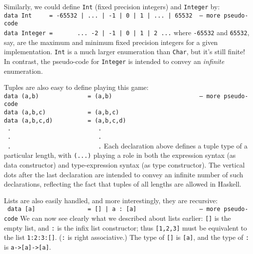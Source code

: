 Similarly, we could define \mbox{\tt Int} (fixed precision integers) and
\mbox{\tt Integer} by: 
\bprog
\mbox{\tt data\ Int\ \ \ \ \ =\ -65532\ |\ ...\ |\ -1\ |\ 0\ |\ 1\ |\ ...\ |\ 65532\ \ --\ more\ pseudo-code}\\
\mbox{\tt data\ Integer\ =\ \ \ \ \ \ \ ...\ -2\ |\ -1\ |\ 0\ |\ 1\ |\ 2\ ...}
\eprog
where \mbox{\tt -65532} and \mbox{\tt 65532}, say, are the maximum and minimum fixed
precision integers for a given implementation.  \mbox{\tt Int} is a much larger
enumeration than \mbox{\tt Char}, but it's still finite!  In contrast, the
pseudo-code for \mbox{\tt Integer} 
is intended to convey an {\em infinite} enumeration.

Tuples are also easy to define playing this game:
\bprog
\mbox{\tt data\ (a,b)\ \ \ \ \ \ \ \ \ \ \ \ \ \ =\ (a,b)\ \ \ \ \ \ \ \ \ \ \ \ \ \ \ \ \ \ \ \ \ \ \ \ \ --\ more\ pseudo-code}\\
\mbox{\tt data\ (a,b,c)\ \ \ \ \ \ \ \ \ \ \ \ =\ (a,b,c)}\\
\mbox{\tt data\ (a,b,c,d)\ \ \ \ \ \ \ \ \ \ =\ (a,b,c,d)}\\
\mbox{\tt \ .\ \ \ \ \ \ \ \ \ \ \ \ \ \ \ \ \ \ \ \ \ \ \ \ \ .}\\
\mbox{\tt \ .\ \ \ \ \ \ \ \ \ \ \ \ \ \ \ \ \ \ \ \ \ \ \ \ \ .}\\
\mbox{\tt \ .\ \ \ \ \ \ \ \ \ \ \ \ \ \ \ \ \ \ \ \ \ \ \ \ \ .}
\eprog
Each declaration above defines a tuple type of a particular length,
with \mbox{\tt (...)} playing a role in both the expression syntax (as data
constructor) and type-expression syntax (as type constructor).  The
vertical dots after the last declaration are intended to convey an
infinite number of such declarations, reflecting the fact that tuples
of all lengths are allowed in Haskell.

Lists are also easily handled, and more interestingly, they are recursive:
\bprog
\mbox{\tt \ data\ [a]\ \ \ \ \ \ \ \ \ \ \ \ \ \ \ =\ []\ |\ a\ :\ [a]\ \ \ \ \ \ \ \ \ \ \ \ \ \ \ \ \ \ --\ more\ pseudo-code}
\eprog
We can now see clearly what we described about lists earlier: \mbox{\tt []} is
the empty list, and \mbox{\tt :} is the infix list constructor; thus \mbox{\tt [1,2,3]}
must be equivalent to the list \mbox{\tt 1:2:3:[]}.  (\mbox{\tt :} is right
associative.)  The type of \mbox{\tt []} is \mbox{\tt [a]}, and the type of \mbox{\tt :} is
\mbox{\tt a->[a]->[a]}.


